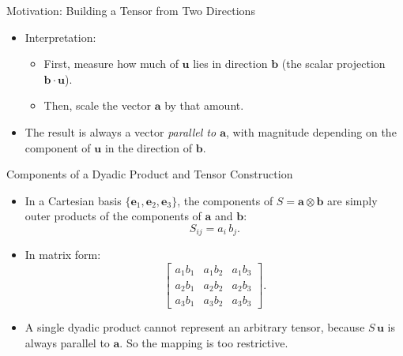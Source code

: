 \documentclass{beamer}
\begin{document}
\begin{frame}{Motivation: Building a Tensor from Two Directions}
\begin{itemize}
    \item Interpretation:
          \begin{itemize}
              \item First, measure how much of $\mathbf{u}$ lies in direction
                    $\mathbf{b}$ (the scalar projection $\mathbf{b}\cdot\mathbf{u}$).
              \item Then, scale the vector $\mathbf{a}$ by that amount.
          \end{itemize}

    \item The result is always a vector \emph{parallel to $\mathbf{a}$}, with
          magnitude depending on the component of $\mathbf{u}$ in the
          direction of $\mathbf{b}$.

\end{itemize}

\end{frame}

\begin{frame}{Components of a Dyadic Product and Tensor Construction}

\begin{itemize}

    \item In a Cartesian basis $\{\mathbf{e}_1,\mathbf{e}_2,\mathbf{e}_3\}$,
          the components of $S = \mathbf{a} \otimes \mathbf{b}$ are simply
          outer products of the components of $\mathbf{a}$ and $\mathbf{b}$:
          \[
              S_{ij} = a_i\, b_j.
          \]

    \item In matrix form:
          \[
          \begin{bmatrix}
              a_1 b_1 & a_1 b_2 & a_1 b_3 \\
              a_2 b_1 & a_2 b_2 & a_2 b_3 \\
              a_3 b_1 & a_3 b_2 & a_3 b_3
          \end{bmatrix}.
          \]

    \item A single dyadic product cannot represent an arbitrary tensor,
          because $S\,\mathbf{u}$ is always parallel to $\mathbf{a}$.
          So the mapping is too restrictive.
    \end{itemize}
\end{frame}
\end{document}
